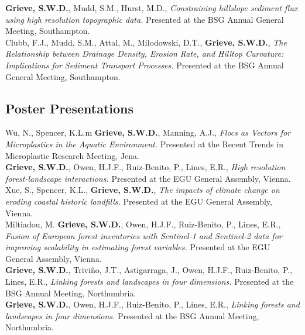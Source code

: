 \documentclass[10pt, a4paper]{article}
\newcommand{\student}{\textbf{\textsuperscript{\textdagger}}}
\newcommand{\years}[1]{\marginnote{\scriptsize #1}}
\begin{document}
\years{2015}\textbf{Grieve, S.W.D.}, Mudd, S.M., Hurst, M.D., \textit{Constraining hillslope sediment flux using high resolution topographic data.} Presented at the BSG Annual General Meeting, Southampton.\\[0.05cm]

\years{2015}Clubb, F.J., Mudd, S.M., Attal, M., Milodowski, D.T., \textbf{Grieve, S.W.D.}, \textit{The Relationship between Drainage Density, Erosion Rate, and Hilltop Curvature: Implications for Sediment Transport Processes.} Presented at the BSG Annual General Meeting, Southampton.

\subsection*{Poster Presentations}

\years{2023}Wu, N.\student, Spencer, K.L.m \textbf{Grieve, S.W.D.}, Manning, A.J., \textit{Flocs as Vectors for Microplastics in the Aquatic Environment.} Presented at the Recent Trends in Microplastic Research Meeting, Jena.\\[0.05cm]

\years{2023}\textbf{Grieve, S.W.D.}, Owen, H.J.F., Ruiz-Benito, P., Lines, E.R., \textit{High resolution forest-landscape interactions.} Presented at the EGU General Assembly, Vienna.\\[0.05cm]

\years{2023}Xue, S.\student, Spencer, K.L., \textbf{Grieve, S.W.D.}, \textit{The impacts of climate change on eroding coastal historic landfills.} Presented at the EGU General Assembly, Vienna.\\[0.05cm]

\years{2023} Miltiadou, M. \textbf{Grieve, S.W.D.}, Owen, H.J.F., Ruiz-Benito, P., Lines, E.R., \textit{Fusion of European forest inventories with Sentinel-1 and Sentinel-2 data for improving scalability in estimating forest variables.} Presented at the EGU General Assembly, Vienna.\\[0.05cm]

\years{2022}\textbf{Grieve, S.W.D.}, Trivi\~{n}o, J.T., Astigarraga, J., Owen, H.J.F., Ruiz-Benito, P., Lines, E.R., \textit{Linking forests and landscapes in four dimensions.} Presented at the BSG Annual Meeting, Northumbria.\\[0.05cm]

\years{2022}\textbf{Grieve, S.W.D.}, Owen, H.J.F., Ruiz-Benito, P., Lines, E.R., \textit{Linking forests and landscapes in four dimensions.} Presented at the BSG Annual Meeting, Northumbria.\\[0.05cm]
\end{document}

